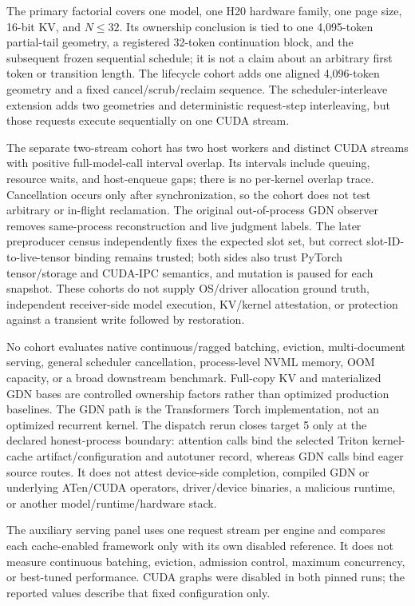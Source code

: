 \documentclass{article}
\begin{document}
The primary factorial covers one model, one H20 hardware family, one page
size, 16-bit KV, and $N\leq32$.  Its ownership conclusion is tied to one
4,095-token partial-tail geometry, a registered 32-token continuation block,
and the subsequent frozen sequential schedule; it is not a claim about an
arbitrary first token or transition length.  The lifecycle cohort adds one
aligned 4,096-token geometry and a fixed cancel/scrub/reclaim sequence.  The
scheduler-interleave extension adds two geometries and deterministic
request-step interleaving, but those requests execute sequentially on one CUDA
stream.

The separate two-stream cohort has two host workers and distinct CUDA streams
with positive full-model-call interval overlap.  Its intervals include
queuing, resource waits, and host-enqueue gaps; there is no per-kernel overlap
trace.  Cancellation occurs only after synchronization, so the cohort does not
test arbitrary or in-flight reclamation.  The original out-of-process GDN
observer removes same-process reconstruction and live judgment labels.  The
later preproducer census independently fixes the expected slot set, but correct
slot-ID-to-live-tensor binding remains trusted; both sides also trust PyTorch
tensor/storage and CUDA-IPC semantics, and mutation is paused for each snapshot.
These cohorts do not supply OS/driver allocation ground truth, independent
receiver-side model execution, KV/kernel attestation, or protection against a
transient write followed by restoration.

No cohort evaluates native continuous/ragged batching, eviction,
multi-document serving, general scheduler cancellation, process-level NVML
memory, OOM capacity, or a broad downstream benchmark.  Full-copy KV and
materialized GDN bases are controlled ownership factors rather than optimized
production baselines.  The GDN path is the Transformers Torch implementation,
not an optimized recurrent kernel.  The dispatch rerun closes target 5 only at
the declared honest-process boundary: attention calls bind the selected Triton
kernel-cache artifact/configuration and autotuner record, whereas GDN calls bind
eager source routes.  It does not attest device-side completion, compiled GDN
or underlying ATen/CUDA operators, driver/device binaries, a malicious runtime,
or another model/runtime/hardware stack.

The auxiliary serving panel uses one request stream per engine and compares
each cache-enabled framework only with its own disabled reference.  It does not
measure continuous batching, eviction, admission control, maximum concurrency,
or best-tuned performance.  CUDA graphs were disabled in both pinned runs; the
reported values describe that fixed configuration only.
\end{document}
